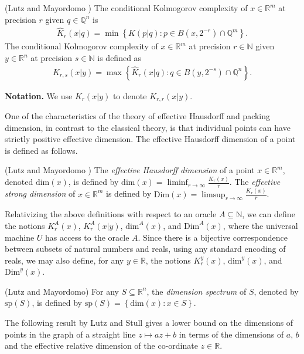 \documentclass[a4paper,UKenglish,cleveref,autoref,thm-restate]{lipics-v2021}
\newcommand{\N}{\mathbb{N}}
\newcommand{\Q}{\mathbb{Q}}
\newcommand{\R}{\mathbb{R}}
\renewcommand{\dim}{{\mathrm{dim}}}
\newcommand{\Dim}{{\mathrm{Dim}}}
\begin{document}
\begin{definition}
  (Lutz and Mayordomo \cite{Lutz2008a}) 
  The conditional Kolmogorov complexity of $x\in\R^m$ at precision
  $r$ given $q\in\Q^n$ is
\begin{align*}
\hat{K}_r\left(x|q\right)=\min\left\{K\left(p|q\right):p\in B\left(x,2^{-r}\right)\cap\Q^m\right\}.
\end{align*}
The conditional Kolmogorov complexity of $x\in\mathbb{R}^m$ at
precision $r\in\mathbb{N}$ given $y \in \mathbb{R}^n$ at precision
$s\in\N$ is defined as
\begin{align*}
K_{r,s}\left(x|y\right)=\max\left\{\hat{K}_r(x|q):q\in B\left(y,2^{-s}\right)\cap \Q^n\right\}.
\end{align*}
\end{definition}

{\bf Notation.} We use $K_r\left(x|y\right)$ to denote $K_{r,r}\left(x|y\right)$. 

One of the characteristics of the theory of effective Hausdorff and packing dimension, in contrast to the classical theory, is that individual points can have strictly positive effective dimension. The effective Hausdorff dimension of a point is defined as follows. 

\begin{definition}(Lutz and Mayordomo \cite{Lutz2008a}) The \emph{effective Hausdorff dimension}
  of a point $x\in\R^m$, denoted $\dim(x)$, is defined by
  $ \dim(x)=\liminf_{r\rightarrow\infty}\frac{K_r(x)}{r}$. The
  \emph{effective strong dimension} of $x\in\mathbb{R}^m$ is defined
  by
$\Dim(x)=\limsup_{r\rightarrow\infty}\frac{K_r(x)}{r}$.
\end{definition}
Relativizing the above definitions with respect to an oracle $A \subseteq \N$, we can define the notions $K^A_r(x)$, $K^A_r(x|y)$, $\dim^A(x)$, and $\Dim^A(x)$, where the universal machine $U$ has access to the oracle $A$. Since there is a bijective correspondence between subsets of natural numbers and reals, using any standard encoding of reals, we may also define, for any $y\in\mathbb{R}$, the notions $K^y_r(x)$, $\dim^y(x)$, and $\Dim^y(x)$. 

\begin{definition}(Lutz and
Mayordomo\cite{Lutz2020d})
	For any $S \subseteq \R^n$, the \emph{dimension spectrum} of $S$, denoted by $\text{sp}(S)$, is defined by $\text{sp}(S)=\left\{\dim(x):x\in S\right\}$. 
\end{definition}
The following result by Lutz and Stull \cite{Lutz2020e} gives a lower bound on the dimensions of points in the graph of a straight line $z\mapsto az+b$ in terms of the dimensions of $a$, $b$ and the effective relative dimension of the co-ordinate $z\in\R$.
\end{document}

